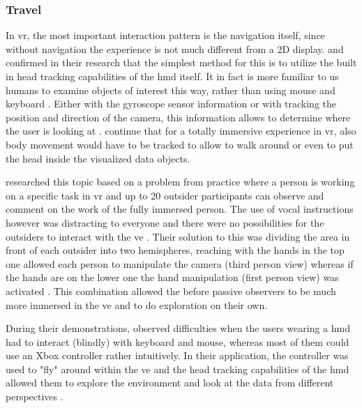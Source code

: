 
\subsubsection{Travel}

In \gls{vr}, the most important interaction pattern is the navigation itself, since without navigation the experience is not much different from a 2D display. \cite{Kwon2015} and \cite{Jamieson2007} confirmed in their research that the simplest method for this is to utilize the built in head tracking capabilities of the \gls{hmd} itself. It in fact is more familiar to us humans to examine objects of interest this way, rather than using mouse and keyboard \citep{Jamieson2007}. Either with the gyroscope sensor information or with tracking the position and direction of the camera, this information allows to determine where the user is looking at \citep{Kwon2015}. \cite{Jamieson2007} continue that for a totally immersive experience in \gls{vr}, also body movement would have to be tracked to allow to walk around or even to put the head inside the visualized data objects.

\cite{Deligiannidis2003} researched this topic based on a problem from practice where a person is working on a specific task in \gls{vr} and up to 20 outsider participants can observe and comment on the work of the fully immersed person. The use of vocal instructions however was distracting to everyone and there were no possibilities for the outsiders to interact with the \gls{ve} \citep{Deligiannidis2003}. Their solution to this was dividing the area in front of each outsider into two hemispheres, reaching with the hands in the top one allowed each person to manipulate the camera (third person view) whereas if the hands are on the lower one the hand manipulation (first person view) was activated \citep{Deligiannidis2003}. This combination allowed the before passive observers to be much more immersed in the \gls{ve} and to do exploration on their own.

During their demonstrations, \cite{Drouhard2015} observed difficulties when the users wearing a \gls{hmd} had to interact (blindly) with keyboard and mouse, whereas most of them could use an Xbox controller rather intuitively. In their application, the controller was used to "fly" around within the \gls{ve} and the head tracking capabilities of the \gls{hmd} allowed them to explore the environment and look at the data from different perspectives \citep{Drouhard2015}.

